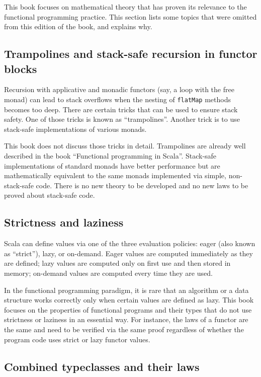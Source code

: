 This book focuses on mathematical theory that has proven its relevance
to the functional programming practice. This section lists some topics
that were omitted from this edition of the book, and explains why.

\subsection{Trampolines and stack-safe recursion in functor blocks}

Recursion with applicative and monadic functors (say, a loop with
the free monad) can lead to stack overflows when the nesting of \lstinline!flatMap!
methods becomes too deep. There are certain tricks that can be used
to ensure stack safety. One of those tricks is known as \textsf{``}trampolines\textsf{''}.
Another trick is to use stack-safe implementations of various monads. 

This book does not discuss those tricks in detail. Trampolines are
already well described in the book \textsf{``}Functional programming in Scala\textsf{''}.
Stack-safe implementations of standard monads have better performance
but are mathematically equivalent to the same monads implemented via
simple, non-stack-safe code. There is no new theory to be developed
and no new laws to be proved about stack-safe code.

\subsection{Strictness and laziness}

Scala can define values via one of the three evaluation policies:
eager (also known as \textsf{``}strict\textsf{''}), lazy, or on-demand. Eager values
are computed immediately as they are defined; lazy values are computed
only on first use and then stored in memory; on-demand values are
computed every time they are used. 

In the functional programming paradigm, it is rare that an algorithm
or a data structure works correctly only when certain values are defined
as lazy. This book focuses on the properties of functional programs
and their types that do not use strictness or laziness in an essential
way. For instance, the laws of a functor are the same and need to
be verified via the same proof regardless of whether the program code
uses strict or lazy functor values. 

\subsection{Combined typeclasses and their laws}

